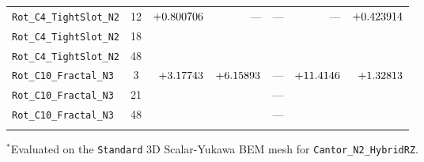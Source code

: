 \begin{table}[!htbp]
{\begin{tabular}{lcrrrrr}
\texttt{Rot\_C4\_TightSlot\_N2} & 12 & $+0.800706{}$ & --- & --- & --- & $+0.423914{}$ \\
\texttt{Rot\_C4\_TightSlot\_N2} & 18 & \RotCfourTightslotNtwoThetaOneeightStepThreeFNetPn{} & \RotCfourTightslotNtwoHighThetaZerooneeightpzeroVectorDyadicFZPn{} & \RotCfourTightslotNtwoUltraHighThetaZerooneeightpzeroVectorDyadicFZPn{} & \RotCfourTightslotNtwoHighThetaZerooneeightpzeroScalarYukawaFZPn{} & \RotCfourTightslotNtwoMeepThetaoneeightFZPn{} \\
\texttt{Rot\_C4\_TightSlot\_N2} & 48 & \RotCfourTightslotNtwoThetaFoureightStepEightFNetPn{} & \RotCfourTightslotNtwoHighThetaZerofoureightpzeroVectorDyadicFZPn{} & \RotCfourTightslotNtwoUltraHighThetaZerofoureightpzeroVectorDyadicFZPn{} & \RotCfourTightslotNtwoHighThetaZerofoureightpzeroScalarYukawaFZPn{} & \RotCfourTightslotNtwoMeepThetafoureightFZPn{} \\
\texttt{Rot\_C10\_Fractal\_N3} & 3 & $+3.17743{}$ & $+6.15893{}$ & --- & $+11.4146{}$ & $+1.32813{}$ \\
\texttt{Rot\_C10\_Fractal\_N3} & 21 & \RotConezeroFractalNthreeStandardThetaZerotwoonepzeroVectorDyadicFZPn{} & \RotConezeroFractalNthreeHighThetaZerotwoonepzeroVectorDyadicFZPn{} & --- & \RotConezeroFractalNthreeHighThetaZerotwoonepzeroScalarYukawaFZPn{} & \RotConezeroFractalNthreeMeepThetatwooneFZPn{} \\
\texttt{Rot\_C10\_Fractal\_N3} & 48 & \RotConezeroFractalNthreeStandardThetaZerofoureightpzeroVectorDyadicFZPn{} & \RotConezeroFractalNthreeHighThetaZerofoureightpzeroVectorDyadicFZPn{} & --- & \RotConezeroFractalNthreeHighThetaZerofoureightpzeroScalarYukawaFZPn{} & \RotConezeroFractalNthreeMeepThetafoureightFZPn{} \\
\botrule
\end{tabular}%
}
\smallskip
\footnotesize{$^{\ast}$Evaluated on the \texttt{Standard} 3D Scalar-Yukawa BEM mesh for \texttt{Cantor\_N2\_HybridRZ}.}
\end{table}
